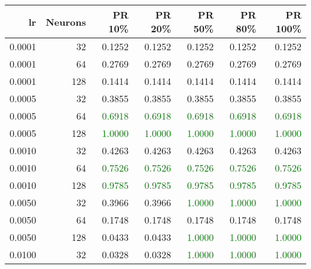 \begin{tabular}{rrrrrrr}
\toprule
lr & Neurons & PR 10\% & PR 20\% & PR 50\% & PR 80\% & PR 100\% \\
\midrule
0.0001 & 32 & \textcolor{blu} {0.1252} & \textcolor{blu} {0.1252} & \textcolor{blu} {0.1252} & \textcolor{blu} {0.1252} & \textcolor{blu} {0.1252} \\
0.0001 & 64 & \textcolor{blu} {0.2769} & \textcolor{blu} {0.2769} & \textcolor{blu} {0.2769} & \textcolor{blu} {0.2769} & \textcolor{blu} {0.2769} \\
0.0001 & 128 & \textcolor{blu} {0.1414} & \textcolor{blu} {0.1414} & \textcolor{blu} {0.1414} & \textcolor{blu} {0.1414} & \textcolor{blu} {0.1414} \\
0.0005 & 32 & \textcolor{blu} {0.3855} & \textcolor{blu} {0.3855} & \textcolor{blu} {0.3855} & \textcolor{blu} {0.3855} & \textcolor{blu} {0.3855} \\
0.0005 & 64 & \textcolor{green} {0.6918} & \textcolor{green} {0.6918} & \textcolor{green} {0.6918} & \textcolor{green} {0.6918} & \textcolor{green} {0.6918} \\
0.0005 & 128 & \textcolor{green} {1.0000} & \textcolor{green} {1.0000} & \textcolor{green} {1.0000} & \textcolor{green} {1.0000} & \textcolor{green} {1.0000} \\
0.0010 & 32 & \textcolor{blu} {0.4263} & \textcolor{blu} {0.4263} & \textcolor{blu} {0.4263} & \textcolor{blu} {0.4263} & \textcolor{blu} {0.4263} \\
0.0010 & 64 & \textcolor{green} {0.7526} & \textcolor{green} {0.7526} & \textcolor{green} {0.7526} & \textcolor{green} {0.7526} & \textcolor{green} {0.7526} \\
0.0010 & 128 & \textcolor{green} {0.9785} & \textcolor{green} {0.9785} & \textcolor{green} {0.9785} & \textcolor{green} {0.9785} & \textcolor{green} {0.9785} \\
0.0050 & 32 & \textcolor{blu} {0.3966} & \textcolor{blu} {0.3966} & \textcolor{green} {1.0000} & \textcolor{green} {1.0000} & \textcolor{green} {1.0000} \\
0.0050 & 64 & \textcolor{blu} {0.1748} & \textcolor{blu} {0.1748} & \textcolor{blu} {0.1748} & \textcolor{blu} {0.1748} & \textcolor{blu} {0.1748} \\
0.0050 & 128 & \textcolor{blu} {0.0433} & \textcolor{blu} {0.0433} & \textcolor{green} {1.0000} & \textcolor{green} {1.0000} & \textcolor{green} {1.0000} \\
0.0100 & 32 & \textcolor{blu} {0.0328} & \textcolor{blu} {0.0328} & \textcolor{green} {1.0000} & \textcolor{green} {1.0000} & \textcolor{green} {1.0000} \\

\end{tabular}
